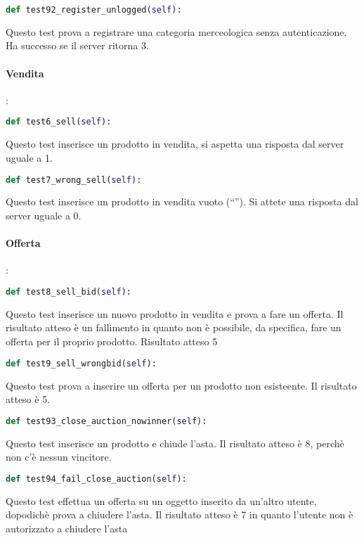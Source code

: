 \begin{lstlisting}[language=python]
def test92_register_unlogged(self):
\end{lstlisting}
Questo test prova a registrare una categoria merceologica senza autenticazione. Ha successo se il server ritorna 3.

\paragraph{\textbf{Vendita}}:
\begin{lstlisting}[language=python]
def test6_sell(self):
\end{lstlisting}
Questo test inserisce un prodotto in vendita, si aspetta una risposta dal server uguale a 1.

\begin{lstlisting}[language=python]
def test7_wrong_sell(self):
\end{lstlisting}
Questo test inserisce un prodotto in vendita vuoto (``''). Si attete una risposta dal server uguale a 0.

\paragraph{\textbf{Offerta}}:

\begin{lstlisting}[language=python]
def test8_sell_bid(self):
\end{lstlisting}
Questo test inserisce un nuovo prodotto in vendita e prova a fare un offerta. Il risultato atteso è un fallimento in quanto non è possibile, da specifica, fare un offerta per il proprio prodotto. Risultato atteso 5

\begin{lstlisting}[language=python]
def test9_sell_wrongbid(self):
\end{lstlisting}
Questo test prova a inserire un offerta per un prodotto non esisteente. Il risultato atteso è 5.

\begin{lstlisting}[language=python]
def test93_close_auction_nowinner(self):
\end{lstlisting}
Questo test inserisce un prodotto e chiude l'asta. Il risultato atteso è 8, perchè non c'è nessun vincitore.


\begin{lstlisting}[language=python]
def test94_fail_close_auction(self):
\end{lstlisting}
Questo test effettua un offerta su un oggetto inserito da un'altro utente, dopodichè prova a chiudere l'asta.
Il risultato atteso è 7 in quanto l'utente non è autorizzato a chiudere l'asta


